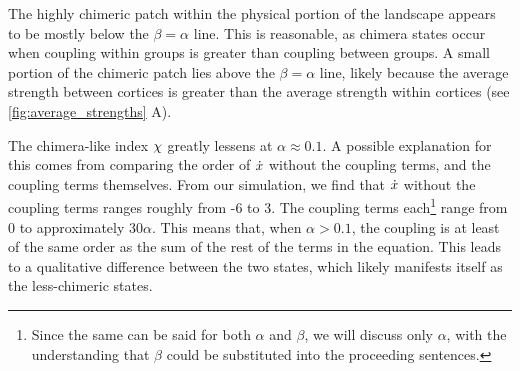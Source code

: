 The highly chimeric patch within the physical portion of the landscape appears to be mostly below the $\beta = \alpha$ line.
This is reasonable, as chimera states occur when coupling within groups is greater than coupling between groups.
A small portion of the chimeric patch lies above the $\beta = \alpha$ line, likely because the average strength between cortices is greater than the average strength within cortices (see \cref{fig:average_strengths} A).

The chimera-like index $\chi$ greatly lessens at $\alpha \approx 0.1$.
A possible explanation for this comes from comparing the order of $\dot{x}$ without the coupling terms, and the coupling terms themselves.
From our simulation, we find that $\dot{x}$ without the coupling terms ranges roughly from -6 to 3.
The coupling terms each\footnote{Since the same can be said for both $\alpha$ and $\beta$, we will discuss only $\alpha$, with the understanding that $\beta$ could be substituted into the proceeding sentences.}
range from 0 to approximately $30 \alpha$.
This means that, when $\alpha > 0.1$, the coupling is at least of the same order as the sum of the rest of the terms in the equation.
This leads to a qualitative difference between the two states, which likely manifests itself as the less-chimeric states.

